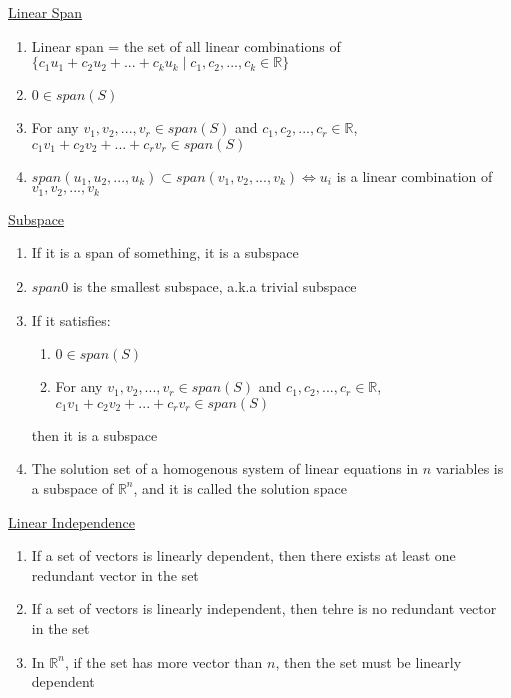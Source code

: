\documentclass[a4paper,1pt,landscape]{article}
\begin{document}
\begin{multicols}{3}
\underline{Linear Span}
\begin{enumerate}
\item Linear span = the set of all linear combinations of \( \{c_1 u_1 + c_2 u_2 + ... + c_k u_k \mid c_1, c_2,..., c_k \in \mathbb{R} \} \)
\item $0 \in span(S)$
\item For any $v_1, v_2, ..., v_r \in span(S)$ and $c_1, c_2, ..., c_r \in \mathbb{R}$, $c_1v_1 + c_2v_2 + ... + c_rv_r \in span(S)$
\item $span(u_1, u_2, ..., u_k) \subset span(v_1, v_2, ..., v_k) \Leftrightarrow u_i$ is a linear combination of $v_1, v_2, ..., v_k$
\end{enumerate}

\underline{Subspace}
\begin{enumerate}
\item If it is a span of something, it is a subspace
\item $span{0}$ is the smallest subspace, a.k.a trivial subspace
\item If it satisfies:
\begin{enumerate}
    \item $0 \in span(S)$
    \item For any $v_1, v_2, ..., v_r \in span(S)$ and $c_1, c_2, ..., c_r \in \mathbb{R}$, $c_1v_1 + c_2v_2 + ... + c_rv_r \in span(S)$
\end{enumerate} then it is a subspace
\item The solution set of a homogenous system of linear equations in $n$ variables is a subspace of $\mathbb{R}^n$, and it is called the solution space
\end{enumerate}

\underline{Linear Independence}
\begin{enumerate}
\item If a set of vectors is linearly dependent, then there exists at least one redundant vector in the set
\item If a set of vectors is linearly independent, then tehre is no redundant vector in the set
\item In $\mathbb{R}^n$, if the set has more vector than $n$, then the set must be linearly dependent
\end{enumerate}


\end{multicols}
\end{document}

